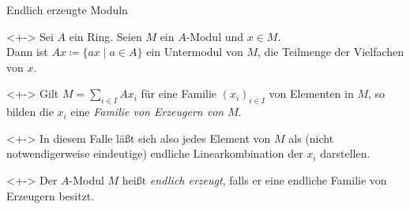 \begin{frame}{Endlich erzeugte Moduln}
	\begin{visibleenv}<+->
		Sei \(A\) ein Ring. Seien \(M\) ein \(A\)-Modul und \(x \in M\).
		\\
		Dann ist \(A x \coloneqq \{a x \mid a \in A\}\) ein Untermodul von \(M\), die Teilmenge der
		Vielfachen von \(x\).
	\end{visibleenv}
	\begin{definition}<+->
		Gilt \(M = \sum\limits_{i \in I} A x_i\) für eine Familie \((x_i)_{i \in I}\) von Elementen
		in \(M\), so bilden die \(x_i\) eine \emph{Familie von Erzeugern von \(M\)}.
	\end{definition}
	\begin{visibleenv}<+->
		In diesem Falle läßt sich also jedes Element von \(M\) als (nicht notwendigerweise eindeutige)
		endliche Linearkombination der \(x_i\) darstellen.
	\end{visibleenv}
	\begin{definition}<+->
		Der \(A\)-Modul \(M\) heißt \emph{endlich erzeugt}, falls er eine endliche Familie von
		Erzeugern besitzt.
	\end{definition}
\end{frame}

